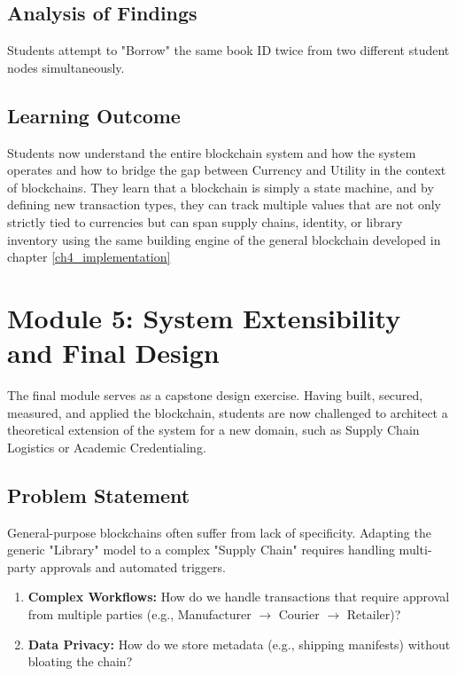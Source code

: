 \subsection{Analysis of Findings}
Students attempt to "Borrow" the same book ID twice from two different student nodes simultaneously.

\subsection{Learning Outcome}
Students now understand the entire blockchain system and how the system operates and how to bridge the gap between Currency and Utility in the context of blockchains. They learn that a blockchain is simply a state machine, and by defining new transaction types, they can track multiple values that are not only strictly tied to currencies but can span supply chains, identity, or library inventory using the same building engine of the general blockchain developed in chapter \ref{ch4_implementation}

\newpage

\section{Module 5: System Extensibility and Final Design} \label{ch5_module5}

The final module serves as a capstone design exercise. Having built, secured, measured, and applied the blockchain, students are now challenged to architect a theoretical extension of the system for a new domain, such as Supply Chain Logistics or Academic Credentialing.

\subsection{Problem Statement}
General-purpose blockchains often suffer from lack of specificity. Adapting the generic "Library" model to a complex "Supply Chain" requires handling multi-party approvals and automated triggers.
\begin{enumerate}
    \item \textbf{Complex Workflows:} How do we handle transactions that require approval from multiple parties (e.g., Manufacturer $\rightarrow$ Courier $\rightarrow$ Retailer)?
    \item \textbf{Data Privacy:} How do we store metadata (e.g., shipping manifests) without bloating the chain?
\end{enumerate}


